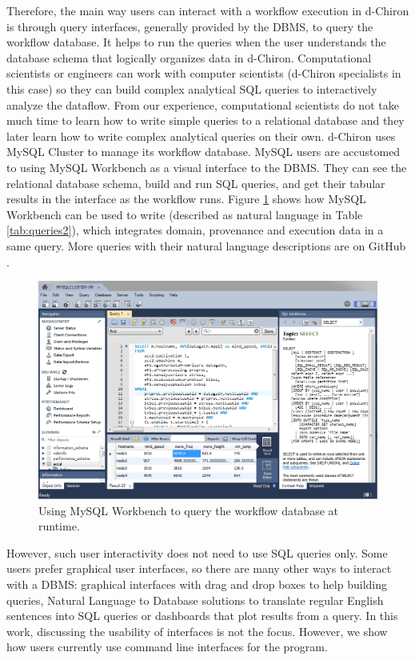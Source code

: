 Therefore, the main way users can interact with a workflow execution in
d-Chiron is through query interfaces, generally provided by the DBMS, to
query the workflow database. It helps to run the queries when the user understands the database schema that logically organizes data in
d-Chiron. Computational scientists or engineers can work with computer scientists
(d-Chiron specialists in this case) so they can build complex analytical SQL
queries to interactively analyze the dataflow. From our experience,
computational scientists do not take much time to learn how to write
simple queries to a relational database and they later learn how to
write complex analytical queries on their own. d-Chiron uses MySQL
Cluster to manage its workflow database. MySQL users are accustomed to using
MySQL Workbench as a visual interface to the DBMS. They can see the
relational database schema, build and run SQL queries, and get their
tabular results in the interface as the workflow runs. Figure \ref{fig:mysql_workbench} shows
how MySQL Workbench can be used to write  (described as natural language in Table \ref{tab:queries2}), which integrates domain, provenance
and execution data in a same query. More queries with their natural
language descriptions are on GitHub \cite{d-ChironGitHub}.

\begin{figure}
    \centering
   \includegraphics[width=\textwidth,keepaspectratio]{img/mysql_workbench.png}
    \caption{Using MySQL Workbench to query the workflow database at runtime.}
    \label{fig:mysql_workbench}
\end{figure}


However, such user interactivity does not need to use SQL queries only. Some
users prefer graphical user interfaces, so there are many other ways to
interact with a DBMS: graphical interfaces with drag and drop boxes to
help building queries, Natural Language to Database solutions to
translate regular English sentences into SQL queries or dashboards that
plot results from a query. 
In this work, discussing the
usability of interfaces is not the focus. However, we show how
users currently use command line interfaces for the  program.

